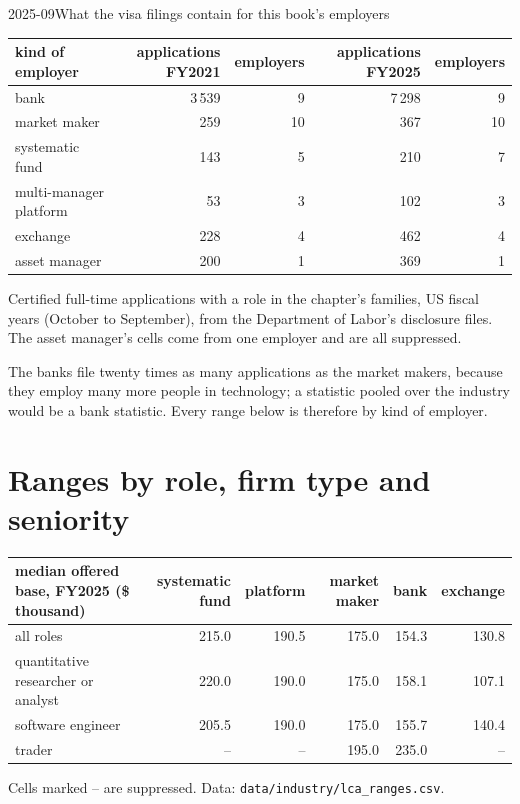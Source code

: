 \begin{dated}{2025-09}{What the visa filings contain for this book's employers}\label{dat:in:pay-levels-by-role-firm-type-and-seniority:counts}
\footnotesize
\begin{tabular}{@{}lrrrr@{}}
\toprule
kind of employer & applications FY2021 & employers & applications FY2025 & employers\\
\midrule
bank & 3\,539 & 9 & 7\,298 & 9\\
market maker & 259 & 10 & 367 & 10\\
systematic fund & 143 & 5 & 210 & 7\\
multi-manager platform & 53 & 3 & 102 & 3\\
exchange & 228 & 4 & 462 & 4\\
asset manager & 200 & 1 & 369 & 1\\
\bottomrule
\end{tabular}

\smallskip\noindent Certified full-time applications with a role in the chapter's families, US fiscal years (October to
September), from the Department of Labor's disclosure files. The asset manager's cells come from one employer and are
all suppressed.
\end{dated}

The banks file twenty times as many applications as the market makers, because they employ many more people in
technology; a statistic pooled over the industry would be a bank statistic. Every range below is therefore by kind of
employer.

\section{Ranges by role, firm type and seniority}

\begin{center}\footnotesize
\begin{tabular}{@{}lrrrrr@{}}
\toprule
median offered base, FY2025 (\$ thousand) & systematic fund & platform & market maker & bank & exchange\\
\midrule
all roles & 215.0 & 190.5 & 175.0 & 154.3 & 130.8\\
quantitative researcher or analyst & 220.0 & 190.0 & 175.0 & 158.1 & 107.1\\
software engineer & 205.5 & 190.0 & 175.0 & 155.7 & 140.4\\
trader & -- & -- & 195.0 & 235.0 & --\\
\bottomrule
\end{tabular}

\smallskip Cells marked -- are suppressed. Data: \texttt{data/industry/lca\_ranges.csv}.
\end{center}

